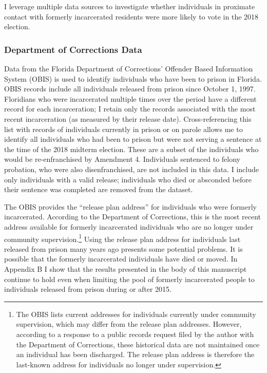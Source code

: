 \documentclass[
  12pt,
]{article}
\begin{document}
I leverage multiple data sources to investigate whether individuals in proximate contact with formerly incarcerated residents were more likely to vote in the 2018 election.

\hypertarget{department-of-corrections-data}{%
\subsubsection*{Department of Corrections Data}\label{department-of-corrections-data}}

Data from the Florida Department of Corrections' Offender Based Information System (OBIS) is used to identify individuals who have been to prison in Florida. OBIS records include all individuals released from prison since October 1, 1997. Floridians who were incarcerated multiple times over the period have a different record for each incarceration; I retain only the records associated with the most recent incarceration (as measured by their release date). Cross-referencing this list with records of individuals currently in prison or on parole allows me to identify all individuals who had been to prison but were not serving a sentence at the time of the 2018 midterm election. These are a subset of the individuals who would be re-enfranchised by Amendment 4. Individuals sentenced to felony probation, who were also disenfranchised, are not included in this data. I include only individuals with a valid release; individuals who died or absconded before their sentence was completed are removed from the dataset.

The OBIS provides the ``release plan address'' for individuals who were formerly incarcerated. According to the Department of Corrections, this is the most recent address available for formerly incarcerated individuals who are no longer under community supervision.\footnote{The OBIS lists current addresses for individuals currently under community supervision, which may differ from the release plan addresses. However, according to a response to a public records request filed by the author with the Department of Corrections, these historical data are not maintained once an individual has been discharged. The release plan address is therefore the last-known address for individuals no longer under supervision.} Using the release plan address for individuals last released from prison many years ago presents some potential problems. It is possible that the formerly incarcerated individuals have died or moved. In Appendix B I show that the results presented in the body of this manuscript continue to hold even when limiting the pool of formerly incarcerated people to individuals released from prison during or after 2015.
\end{document}
